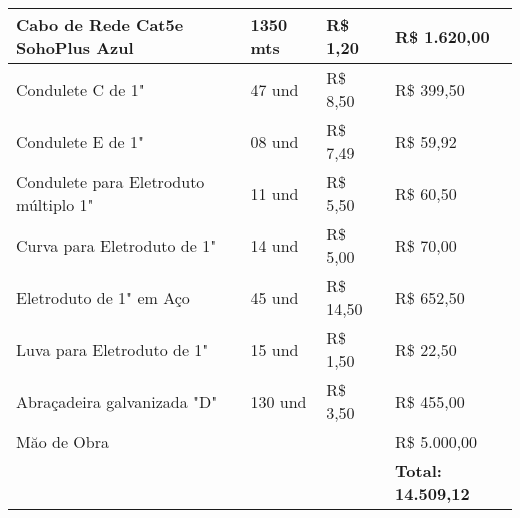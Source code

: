 \begin{table}[h!]
{\begin{tabular}{lll|l|}
		\multicolumn{1}{|l|}{Cabo de Rede Cat5e SohoPlus Azul}                                    & \multicolumn{1}{l|}{1350 mts}            & R\$ 1,20                                     & R\$ 1.620,00                              \\ \hline
		\multicolumn{1}{|l|}{Condulete C de 1"}                                                   & \multicolumn{1}{l|}{47 und}              & R\$ 8,50                                     & R\$ 399,50                                \\ \hline
		\multicolumn{1}{|l|}{Condulete E de 1"}                                                   & \multicolumn{1}{l|}{08 und}              & R\$ 7,49                                     & R\$ 59,92                                 \\ \hline
		\multicolumn{1}{|l|}{Condulete para Eletroduto múltiplo 1"}                               & \multicolumn{1}{l|}{11 und}              & R\$ 5,50                                     & R\$ 60,50                                 \\ \hline
		\multicolumn{1}{|l|}{Curva para Eletroduto de 1"}                                         & \multicolumn{1}{l|}{14 und}              & R\$ 5,00                                     & R\$ 70,00                                 \\ \hline
		\multicolumn{1}{|l|}{Eletroduto de 1" em Aço}                                             & \multicolumn{1}{l|}{45 und}              & R\$ 14,50                                    & R\$ 652,50                                \\ \hline
		\multicolumn{1}{|l|}{Luva para Eletroduto de 1"}                                          & \multicolumn{1}{l|}{15 und}              & R\$ 1,50                                     & R\$ 22,50                                 \\ \hline
		\multicolumn{1}{|l|}{Abraçadeira galvanizada "D"}                                         & \multicolumn{1}{l|}{130 und}             & R\$ 3,50                                     & R\$ 455,00                                \\ \hline
		\multicolumn{1}{|l|}{Măo de Obra}                                                         & \multicolumn{1}{l|}{}                    &                                              & R\$ 5.000,00                              \\ \hline
		&                                          &                                              & \textbf{Total: 14.509,12}                          \\ \cline{4-4} 
	\end{tabular}
}
\end{table}